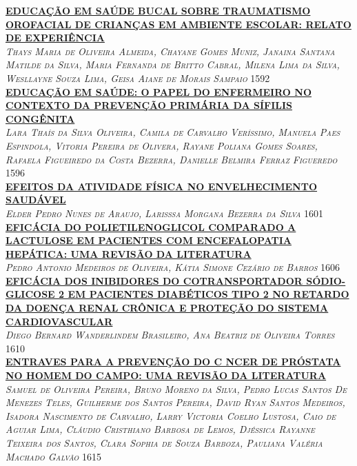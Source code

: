 \noindent \textsc{\hyperlink{trabalhos/246358.pdf.1}{\textbf{EDUCAÇÃO EM SAÚDE BUCAL SOBRE TRAUMATISMO OROFACIAL DE CRIANÇAS EM AMBIENTE ESCOLAR: RELATO DE EXPERIÊNCIA }}}\\ 
\noindent \textsc{\textit{Thays Maria de Oliveira Almeida, Chayane Gomes Muniz, Janaina Santana Matilde da Silva, Maria Fernanda de Britto Cabral, Milena Lima da Silva, Wesllayne Souza Lima, Geisa Aiane de Morais Sampaio}} \hfill 1592\\ 

\noindent \textsc{\hyperlink{trabalhos/249540.pdf.1}{\textbf{EDUCAÇÃO EM SAÚDE: O PAPEL DO ENFERMEIRO NO CONTEXTO DA PREVENÇÃO PRIMÁRIA DA SÍFILIS CONGÊNITA}}}\\ 
\noindent \textsc{\textit{Lara Thaís da Silva Oliveira, Camila de Carvalho Veríssimo, Manuela Paes Espindola, Vitoria Pereira de Olivera, Rayane Poliana Gomes Soares, Rafaela Figueiredo da Costa Bezerra, Danielle Belmira Ferraz Figueredo}} \hfill 1596\\ 

\noindent \textsc{\hyperlink{trabalhos/250370.pdf.1}{\textbf{EFEITOS DA ATIVIDADE FÍSICA NO ENVELHECIMENTO SAUDÁVEL}}}\\ 
\noindent \textsc{\textit{Elder Pedro Nunes de Araujo, Larisssa Morgana Bezerra da Silva}} \hfill 1601\\ 

\noindent \textsc{\hyperlink{trabalhos/249749.pdf.1}{\textbf{EFICÁCIA DO POLIETILENOGLICOL COMPARADO A LACTULOSE EM PACIENTES COM ENCEFALOPATIA HEPÁTICA: UMA REVISÃO DA LITERATURA}}}\\ 
\noindent \textsc{\textit{Pedro Antonio Medeiros de Oliveira, Kátia Simone Cezário de Barros}} \hfill 1606\\ 

\noindent \textsc{\hyperlink{trabalhos/251743.pdf.1}{\textbf{EFICÁCIA DOS INIBIDORES DO COTRANSPORTADOR SÓDIO-GLICOSE 2 EM PACIENTES DIABÉTICOS TIPO 2 NO RETARDO DA DOENÇA RENAL CRÔNICA E PROTEÇÃO DO SISTEMA CARDIOVASCULAR}}}\\ 
\noindent \textsc{\textit{Diego Bernard Wanderlindem Brasileiro, Ana Beatriz de Oliveira Torres}} \hfill 1610\\ 

\noindent \textsc{\hyperlink{trabalhos/250178.pdf.1}{\textbf{ENTRAVES PARA A PREVENÇÃO DO C NCER DE PRÓSTATA NO HOMEM DO CAMPO: UMA REVISÃO DA LITERATURA}}}\\ 
\noindent \textsc{\textit{Samuel de Oliveira Pereira, Bruno Moreno da Silva, Pedro Lucas Santos De Menezes Teles, Guilherme dos Santos Pereira, David Ryan Santos Medeiros, Isadora Nascimento de Carvalho, Larry Victoria Coelho Lustosa, Caio de Aguiar Lima, Cláudio Cristhiano Barbosa de Lemos, Djéssica Rayanne Teixeira dos Santos, Clara Sophia de Souza Barboza, Pauliana Valéria Machado Galvão}} \hfill 1615\\ 

